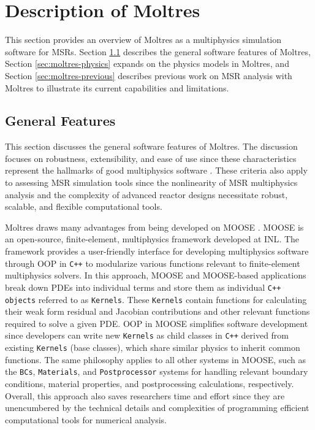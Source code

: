 \section{Description of Moltres} \label{sec:moltres-description}

This section provides an overview of Moltres as a multiphysics
simulation software for \glspl{MSR}. 
Section \ref{sec:moltres-features}
describes the general software features of Moltres, Section
\ref{sec:moltres-physics} expands on the physics models in Moltres, and Section
\ref{sec:moltres-previous} describes previous work on \gls{MSR} analysis with Moltres to illustrate
its current capabilities and limitations.

\subsection{General Features} \label{sec:moltres-features}

This section discusses the general software features of Moltres. The
discussion focuses on robustness, extensibility, and ease of use
since these characteristics represent the hallmarks of good multiphysics
software \cite{keyes_multiphysics_2013}. These criteria also apply to
assessing \gls{MSR} simulation tools since the nonlinearity of \gls{MSR}
multiphysics analysis and the complexity of advanced reactor designs
necessitate robust, scalable, and flexible computational tools.

Moltres draws many advantages from being developed on MOOSE
\cite{giudicelli_30_2024}. MOOSE is an open-source, finite-element,
multiphysics framework developed at \gls{INL}. The framework provides a
user-friendly interface for developing multiphysics software through
\gls{OOP} in \texttt{C++} to modularize various
functions relevant to finite-element multiphysics solvers. In this approach,
MOOSE and MOOSE-based applications break down \glspl{PDE} into individual terms
and store them as individual \texttt{C++ objects} referred to as
\texttt{Kernels}. These \texttt{Kernels} contain functions for calculating
their weak form residual and Jacobian
contributions and other relevant functions required to solve a given
\gls{PDE}. \gls{OOP} in MOOSE simplifies software development
since developers can write new \texttt{Kernels} as child classes in
\texttt{C++} derived from existing \texttt{Kernels} (base classes), which share
similar physics to inherit common functions.
The same philosophy applies to all other systems in MOOSE, such as
the \texttt{BCs}, \texttt{Materials}, and \texttt{Postprocessor}
systems for handling relevant boundary conditions, material properties, and
postprocessing calculations, respectively. Overall, this approach also saves
researchers time and effort since they are unencumbered by the technical details
and complexities of programming efficient computational tools for
numerical analysis.

